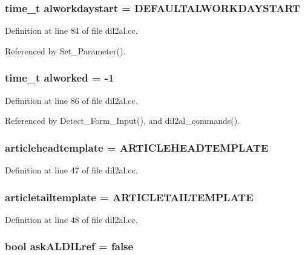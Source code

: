 \subsubsection{\setlength{\rightskip}{0pt plus 5cm}time\_\-t alworkdaystart = DEFAULTALWORKDAYSTART}\label{dil2al_8cc_a66}




Definition at line 84 of file dil2al.cc.

Referenced by Set\_\-Parameter().
\subsubsection{\setlength{\rightskip}{0pt plus 5cm}time\_\-t alworked = -1}\label{dil2al_8cc_a68}




Definition at line 86 of file dil2al.cc.

Referenced by Detect\_\-Form\_\-Input(), and dil2al\_\-commands().
\subsubsection{ articleheadtemplate = ARTICLEHEADTEMPLATE}\label{dil2al_8cc_a21}




Definition at line 47 of file dil2al.cc.
\subsubsection{ articletailtemplate = ARTICLETAILTEMPLATE}\label{dil2al_8cc_a22}




Definition at line 48 of file dil2al.cc.
\subsubsection{\setlength{\rightskip}{0pt plus 5cm}bool ask\-ALDILref = {\bf false}}\label{dil2al_8cc_a36}




